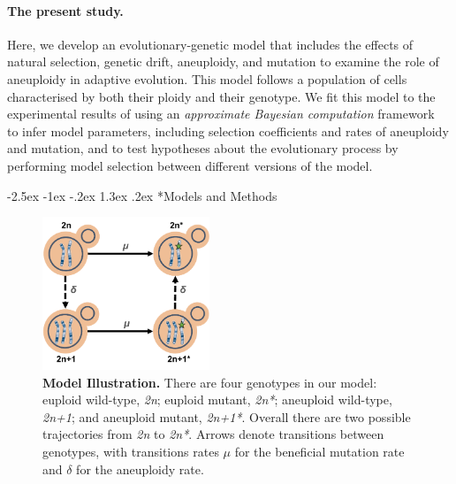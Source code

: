 \documentclass[12pt]{extarticle}
\makeatletter
\renewcommand\section{\@startsection {section}{1}{\z@}%
     {-2.5ex \@plus -1ex \@minus -.2ex}%
     {1.3ex \@plus.2ex}%
    {\Large\bfseries}}
\newcommand{\euwt}{\emph{2n}}
\newcommand{\anwt}{\emph{2n+1}}
\newcommand{\eumt}{\emph{2n*}}
\newcommand{\anmt}{\emph{2n+1*}}
\makeatother
\begin{document}
\paragraph*{The present study.}
Here, we develop an evolutionary-genetic model that includes the effects of natural selection, genetic drift, aneuploidy, and mutation to examine the role of aneuploidy in adaptive evolution.
This model follows a population of cells characterised by both their ploidy and their genotype.
We fit this model to the experimental results of \citet{Yona2012} using an \emph{approximate Bayesian computation} framework~\citep{Sisson2009} to infer model parameters, including selection coefficients and rates of aneuploidy and mutation, and to test hypotheses about the evolutionary process by performing model selection between different versions of the model.


\section*{Models and Methods}

\begin{figure}[b!]
  \centering
    \includegraphics[height=1.8in]{../figures/Fig1-A.pdf}      
  \caption{
    \textbf{Model Illustration.}
    There are four genotypes in our model: euploid wild-type, \euwt; euploid mutant, \eumt; aneuploid wild-type, \anwt; and aneuploid mutant, \anmt.
    Overall there are two possible trajectories from \euwt\; to \eumt.
    Arrows denote transitions between genotypes, with transitions rates $\mu$ for the beneficial mutation rate and $\delta$ for the aneuploidy rate.
   }
  \label{fig:models}
\end{figure}



\end{document}

